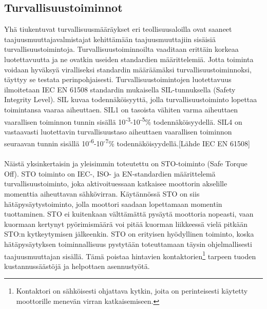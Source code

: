\documentclass[finnish,12pt,a4paper,pdftex,elec,utf8]{aaltothesis}
\begin{document}
	




\subsection{Turvallisuustoiminnot}
Yhä tiukentuvat turvallisuusmääräykset eri teollisuusaloilla ovat saaneet taajuusmuuttajavalmistajat kehittämään taajuusmuuttajiin sisäisiä turvallisuustoimintoja. Turvallisuustoiminnoilta vaaditaan erittäin korkeaa luotettavuutta ja ne ovatkin useiden standardien määrittelemiä. Jotta toiminta voidaan hyväksyä viralliseksi standardin määräämäksi turvallisuustoiminnoksi, täyttyy se testata perinpohjaisesti. Turvallisuustoimintojen luotettavuus ilmoitetaan IEC EN 61508 standardin mukaisella SIL-tunnuksella (Safety Integrity Level). SIL kuvaa todennäköisyyttä, jolla turvallisuustoiminto lopettaa toimintansa vaaraa aiheuttaen. SIL1 on tasoista vähiten varma aiheuttaen vaarallisen toiminnon tunnin sisällä 10\textsuperscript{-3}-10\textsuperscript{-5}\% todennäköisyydellä. SIL4 on vastaavasti luotettavin turvallisuustaso aiheuttaen vaarallisen toiminnon seuraavan tunnin sisällä 10\textsuperscript{-6}-10\textsuperscript{-7}\% todennäköisyydellä.[Lähde IEC EN 61508]
\\\\
Näistä yksinkertaisin ja yleisimmin toteutettu on STO-toiminto (Safe Torque Off). STO toiminto on IEC-, ISO- ja EN-standardien määrittelemä turvallisuustoiminto, joka aktivoituessaan katkaisee moottorin akselille momenttia aiheuttavan sähkövirran. Käytännössä STO on siis hätäpysäytystoiminto, jolla moottori saadaan lopettamaan momentin tuottaminen. STO ei kuitenkaan välttämättä pysäytä moottoria nopeasti, vaan kuormaan kertynyt pyörimismäärä voi pitää kuorman liikkeessä vielä pitkään STO:n kytkeytymisen jälkeenkin. STO on erityisen hyödyllinen toiminto, koska hätäpysäytyksen toiminnallisuus pystytään toteuttamaan täysin ohjelmallisesti taajuusmuuttajan sisällä. Tämä poistaa hintavien kontaktorien\footnote{Kontaktori on sähköisesti ohjattava kytkin, joita on perinteisesti käytetty moottorille menevän virran katkaisemiseen.} tarpeen tuoden kustannussäästöjä ja helpottaen asennustyötä.
\end{document}
